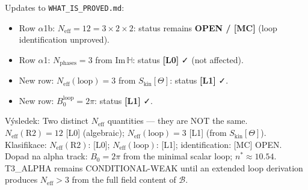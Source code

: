 \documentclass[12pt,a4paper]{article}
\theoremstyle{remark}
\newcommand{\Neff}{N_{\mathrm{eff}}}
\begin{document}
\medskip
\noindent
Updates to \texttt{WHAT\_IS\_PROVED.md}:
\begin{itemize}
  \item Row $\alpha$1b: $N_{\mathrm{eff}} = 12 = 3\times 2\times 2$:
    status remains \textbf{OPEN / [MC]} (loop identification unproved).
  \item Row $\alpha$1: $N_{\mathrm{phases}} = 3$ from $\mathrm{Im}\,\mathbb{H}$:
    status \textbf{[L0]} ✓ (not affected).
  \item New row: $\Neff(\mathrm{loop}) = 3$ from $S_{\mathrm{kin}}[\Theta]$:
    status \textbf{[L1]} ✓.
  \item New row: $B_0^{\mathrm{loop}} = 2\pi$: status \textbf{[L1]} ✓.
\end{itemize}

\begin{statusbox}
Výsledek: Two distinct $\Neff$ quantities — they are NOT the same.
$\Neff(\mathrm{R2}) = 12$ [L0] (algebraic); $\Neff(\mathrm{loop}) = 3$ [L1]
(from $S_{\mathrm{kin}}[\Theta]$).\\
Klasifikace: $\Neff(\mathrm{R2})$: [L0]; $\Neff(\mathrm{loop})$: [L1];
identification: [MC] OPEN.\\
Dopad na alpha track: $B_0 = 2\pi$ from the minimal scalar loop; $n^*\approx 10.54$.
T3\_ALPHA remains CONDITIONAL-WEAK until an extended loop derivation
produces $\Neff > 3$ from the full field content of $\mathcal{B}$.
\end{statusbox}
\end{document}

